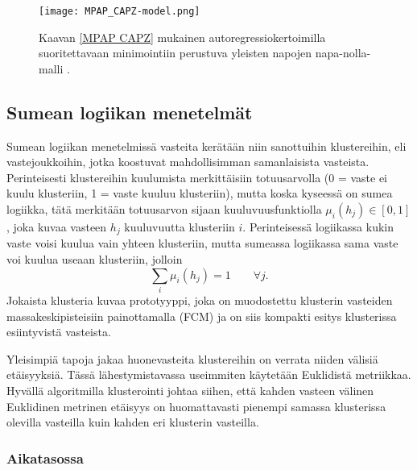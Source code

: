 \documentclass[finnish,12pt]{article}
\begin{document}
\begin{figure}[h!]
\centering
\texttt{[image: MPAP\_CAPZ-model.png]}
\caption{Kaavan \eqref{MPAP CAPZ} mukainen autoregressiokertoimilla suoritettavaan minimointiin perustuva yleisten napojen napa-nolla-malli \cite{YHaneda1997}.}
\label{fig:MPAP_CAPZ}
\end{figure}

\subsection{Sumean logiikan menetelmät}

Sumean logiikan menetelmissä vasteita kerätään niin sanottuihin klustereihin, eli vastejoukkoihin, jotka koostuvat mahdollisimman samanlaisista vasteista. Perinteisesti klustereihin kuulumista merkittäisiin totuusarvolla (0 = vaste ei kuulu klusteriin, 1 = vaste kuuluu klusteriin), mutta koska kyseessä on sumea logiikka, tätä merkitään totuusarvon sijaan kuuluvuusfunktiolla $\mu_i(h_j) \in [0,1]$, joka kuvaa vasteen $h_j$ kuuluvuutta klusteriin $i$. Perinteisessä logiikassa kukin vaste voisi kuulua vain yhteen klusteriin, mutta sumeassa logiikassa sama vaste voi kuulua useaan klusteriin, jolloin \begin{equation}
	\sum\limits_i \mu_i(h_j) = 1 \qquad \forall j.
\end{equation} Jokaista klusteria kuvaa prototyyppi, joka on muodostettu klusterin vasteiden massakeskipisteisiin painottamalla (FCM) ja on siis kompakti esitys klusterissa esiintyvistä vasteista. \cite{SBharitkar2001,ACarini2012}

Yleisimpiä tapoja jakaa huonevasteita klustereihin on verrata niiden välisiä etäisyyksiä. Tässä lähestymistavassa useimmiten käytetään Euklidistä metriikkaa. Hyvällä algoritmilla klusterointi johtaa siihen, että kahden vasteen välinen Euklidinen metrinen etäisyys on huomattavasti pienempi samassa klusterissa olevilla vasteilla kuin kahden eri klusterin vasteilla. \cite{SBharitkar2001}

\subsubsection{Aikatasossa}
\end{document}
